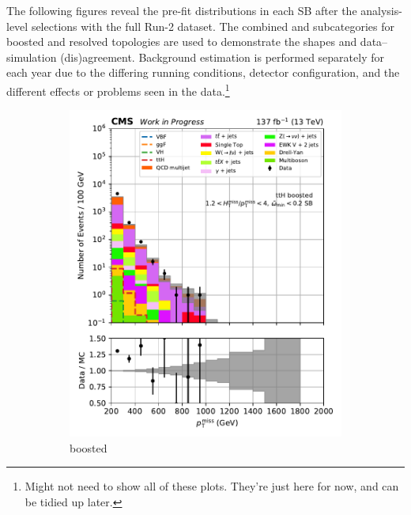 The following figures reveal the pre-fit \ptmiss distributions in each \gls{SB} after the analysis-level selections with the full Run-2 dataset. The combined \ttH and \VH subcategories for boosted and resolved topologies are used to demonstrate the shapes and data--simulation (dis)agreement. Background estimation is performed separately for each year due to the differing running conditions, detector configuration, and the different effects or problems seen in the data.\footnote{Might not need to show all of these plots. They're just here for now, and can be tidied up later.}

\begin{figure}[htbp]
    \centering
    \begin{subfigure}[b]{0.24\textwidth}
        \includegraphics[width=\textwidth]{figures/region_plots/full_Run2/sideband_0/ttH_boosted.pdf}
        \caption{\ttH boosted}
    \end{subfigure}
    \hfill
    \begin{subfigure}[b]{0.24\textwidth}

\end{subfigure}
\end{figure}
